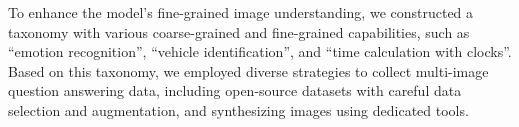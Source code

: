 \documentclass{article}
\begin{document}



To enhance the model's fine-grained image understanding, we constructed a taxonomy with various coarse-grained and fine-grained capabilities, such as ``emotion recognition'', ``vehicle identification'', and ``time calculation with clocks''.
Based on this taxonomy, we employed diverse strategies to collect multi-image question answering data, including open-source datasets with careful data selection and augmentation, and synthesizing images using dedicated tools.
\end{document}
